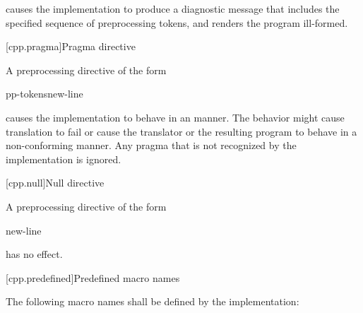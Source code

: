 causes the implementation to produce
a diagnostic message that includes the specified sequence of preprocessing tokens,
and renders the program ill-formed.

[cpp.pragma]{Pragma directive}%
%

\pnum
A preprocessing directive of the form

\begin{ncsimplebnf}
 pp-tokens\opt new-line
\end{ncsimplebnf}

causes the implementation to behave
in an  manner.
The behavior might cause translation to fail or cause the translator or
the resulting program to behave in a non-conforming manner.
Any pragma that is not recognized by the implementation is ignored.

[cpp.null]{Null directive}%

\pnum
A preprocessing directive of the form

\begin{ncsimplebnf}
\terminal{\#} new-line
\end{ncsimplebnf}

has no effect.

[cpp.predefined]{Predefined macro names}
%

\pnum
The following macro names shall be defined by the implementation:

